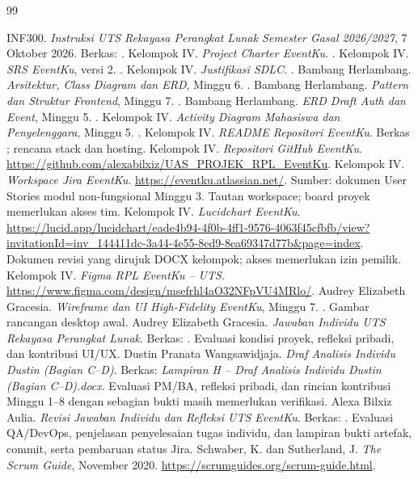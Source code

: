 \documentclass[11pt,a4paper]{article}
\begin{document}
\clearpage\begin{thebibliography}{99}
 INF300. \emph{Instruksi UTS Rekayasa Perangkat Lunak Semester Gasal 2026/2027}, 7 Oktober 2026. Berkas: .
 Kelompok IV. \emph{Project Charter EventKu}. .
 Kelompok IV. \emph{SRS EventKu}, versi 2. .
 Kelompok IV. \emph{Justifikasi SDLC}. .
 Bambang Herlambang. \emph{Arsitektur, Class Diagram dan ERD}, Minggu 6. .
 Bambang Herlambang. \emph{Pattern dan Struktur Frontend}, Minggu 7. .
 Bambang Herlambang. \emph{ERD Draft Auth dan Event}, Minggu 5. .
 Kelompok IV. \emph{Activity Diagram Mahasiswa dan Penyelenggara}, Minggu 5. .
 Kelompok IV. \emph{README Repositori EventKu}. Berkas ; rencana stack dan hosting.
 Kelompok IV. \emph{Repositori GitHub EventKu}. \url{https://github.com/alexabilxiz/UAS_PROJEK_RPL_EventKu}.
 Kelompok IV. \emph{Workspace Jira EventKu}. \url{https://eventku.atlassian.net/}. Sumber: dokumen User Stories modul non-fungsional Minggu 3. Tautan workspace; board proyek memerlukan akses tim.
 Kelompok IV. \emph{Lucidchart EventKu}. \url{https://lucid.app/lucidchart/eade4b94-4f0b-4ff1-9576-4063f45cfbfb/view?invitationId=inv_144411dc-3a44-4e55-8ed9-8ea69347d77b&page=index}. Dokumen revisi yang dirujuk DOCX kelompok; akses memerlukan izin pemilik.
 Kelompok IV. \emph{Figma RPL EventKu -- UTS}. \url{https://www.figma.com/design/msefrhl4aO32NFpVU4MRlo/}.
 Audrey Elizabeth Gracesia. \emph{Wireframe dan UI High-Fidelity EventKu}, Minggu 7. . Gambar rancangan desktop awal.
 Audrey Elizabeth Gracesia. \emph{Jawaban Individu UTS Rekayasa Perangkat Lunak}. Berkas: . Evaluasi kondisi proyek, refleksi pribadi, dan kontribusi UI/UX.
 Dustin Pranata Wangsawidjaja. \emph{Draf Analisis Individu Dustin (Bagian C--D)}. Berkas: \emph{Lampiran H -- Draf Analisis Individu Dustin (Bagian C--D).docx}. Evaluasi PM/BA, refleksi pribadi, dan rincian kontribusi Minggu 1--8 dengan sebagian bukti masih memerlukan verifikasi.
 Alexa Bilxiz Aulia. \emph{Revisi Jawaban Individu dan Refleksi UTS EventKu}. Berkas: . Evaluasi QA/DevOps, penjelasan penyelesaian tugas individu, dan lampiran bukti artefak, commit, serta pembaruan status Jira.
 Schwaber, K. dan Sutherland, J. \emph{The Scrum Guide}, November 2020. \url{https://scrumguides.org/scrum-guide.html}.
\end{thebibliography}
\end{document}
